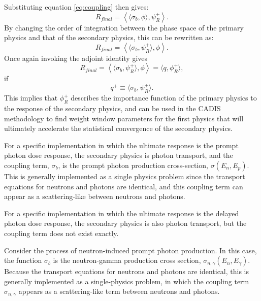 Substituting equation \ref{eq:coupling} then gives:
\begin{equation}
  R_{final} = \left \langle \langle \sigma_b , \phi \rangle, \psi_R^{+} \right\rangle.
\end{equation}
By changing the order of integration between the phase space of the primary
physics and that of the secondary physics, this can be rewritten as:
\begin{equation}\label{eq:pseudo-response}
  R_{final} = \left \langle \langle \sigma_b , \psi_R^{+} \rangle, \phi \right\rangle.
\end{equation}
Once again invoking the adjoint identity gives
\begin{equation}
  R_{final} = \left \langle \langle \sigma_b , \psi_R^{+} \rangle, \phi \right\rangle = \langle q, \phi_R^{+} \rangle,
\end{equation}
if
\begin{equation}
  q^{+} \equiv \langle \sigma_b , \psi_R^{+} \rangle.
\end{equation}
This implies that $\phi_R^{+}$ describes the importance function of the
primary physics to the response of the secondary physics, and can be used in
the CADIS methodology to find weight window parameters for the first physics
that will ultimately accelerate the statistical convergence of the secondary
physics.

For a specific implementation in which the ultimate response is the prompt
photon dose response, the secondary physics is photon transport, and the
coupling term, $\sigma_b$, is the prompt photon production cross-section,
$\sigma(E_n,E_p)$.  This is generally implemented as a single physics problem
since the transport equations for neutrons and photons are identical, and this
coupling term can appear as a scattering-like between neutrons and photons.

For a specific implementation in which the ultimate response is the delayed
photon dose response, the secondary physics is also photon transport, but the
coupling term does not exist exactly.  


Consider the process of neutron-induced prompt photon production.
In this case, the function $\sigma_b$ is the neutron-gamma production
cross section, $\sigma_{n,\gamma}(E_n,E_\gamma)$.  Because the transport
equations for neutrons and photons are identical, this is generally
implemented as a single-physics problem, in which the coupling term
$\sigma_{n,\gamma}$ appears as a scattering-like term between neutrons
and photons.


